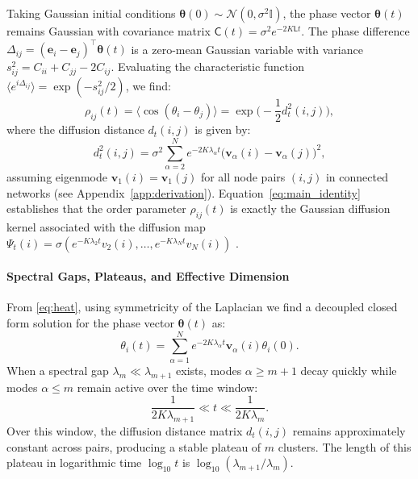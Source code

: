 \documentclass[twocolumn,aps,prl,superscriptaddress,nofootinbib]{revtex4-2}
\theoremstyle{plain}
\theoremstyle{definition}
\newcommand{\Lap}{\mathsf{L}}
\newcommand{\Cov}{\mathsf{C}}
\begin{document}
Taking Gaussian initial conditions $\bm\theta(0) \sim \mathcal{N}(0, \sigma^2 \mathbb{I})$, the phase vector $\bm\theta(t)$ remains Gaussian with covariance matrix \textsc{$\Cov(t) = \sigma^2 e^{-2K\Lap t}$.} The phase difference $\Delta_{ij} = (\bm e_i - \bm e_j)^\top \bm\theta(t)$ is a zero-mean Gaussian variable with variance $s_{ij}^2 = C_{ii} + C_{jj} - 2C_{ij}$. Evaluating the characteristic function $\langle e^{i \Delta_{ij}} \rangle = \exp(-s_{ij}^2/2)$, we find:
\begin{equation}
\rho_{ij}(t) = \langle \cos(\theta_i - \theta_j) \rangle = \exp\Big( -\frac{1}{2} d_t^2(i,j) \Big),
\label{eq:main_identity}
\end{equation}
where the diffusion distance $d_t(i,j)$ is given by:
\begin{equation}
d_t^2(i,j) = \sigma^2 \sum_{\alpha=2}^N e^{-2K\lambda_\alpha t} \big( \bm v_\alpha(i) - \bm v_\alpha(j) \big)^2,
\label{eq:diff_dist_formula}
\end{equation}
assuming eigenmode $\bm{v}_1(i)=\bm{v}_1(j)$ for all node pairs $(i,j)$ in connected networks (see Appendix~\ref{app:derivation}).
Equation~\eqref{eq:main_identity} establishes that the order parameter $\rho_{ij}(t)$ is exactly the Gaussian diffusion kernel associated with the diffusion map $\Psi_t(i) = \sigma (e^{-K\lambda_2 t} v_2(i), \dots, e^{-K\lambda_N t} v_N(i))$ \cite{coifman2006}.

\paragraph{Spectral Gaps, Plateaus, and Effective Dimension}
From \eqref{eq:heat}, using symmetricity of the Laplacian  we find a decoupled closed form solution for the phase vector $\bm\theta(t)$ as:
\begin{equation}
\theta_i(t)=\sum_{\alpha=1}^N e^{-2K\lambda_{\alpha} t}\bm{v}_{\alpha}(i)\theta_i(0).
\label{eq:closed_form}
\end{equation}
When a spectral gap $\lambda_m \ll \lambda_{m+1}$ exists, modes $\alpha \ge m+1$ decay quickly while modes $\alpha \le m$ remain active over the time window:
\begin{equation}
\frac{1}{2K\lambda_{m+1}} \ll t \ll \frac{1}{2K\lambda_m}.
\end{equation}
Over this window, the diffusion distance matrix $d_t(i,j)$ remains approximately constant across pairs, producing a stable plateau of $m$ clusters. The length of this plateau in logarithmic time $\log_{10} t$ is $\log_{10}(\lambda_{m+1}/\lambda_m)$.
\end{document}
